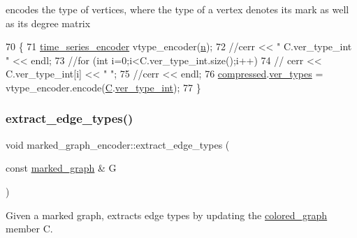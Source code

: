 encodes the type of vertices, where the type of a vertex denotes its mark as well as its degree matrix 


\begin{DoxyCode}
70 \{
71   \hyperlink{classtime__series__encoder}{time\_series\_encoder} vtype\_encoder(\hyperlink{classmarked__graph__encoder_a4c66d9fdbc14c97523715aac7e4511cb}{n});
72   \textcolor{comment}{//cerr << " C.ver\_type\_int " << endl;}
73   \textcolor{comment}{//for (int i=0;i<C.ver\_type\_int.size();i++)}
74   \textcolor{comment}{//  cerr << C.ver\_type\_int[i] << " ";}
75   \textcolor{comment}{//cerr << endl;}
76   \hyperlink{classmarked__graph__encoder_ac2ded200860fdd2321f86dd76b28bcb3}{compressed}.\hyperlink{classmarked__graph__compressed_af446cc5e23c241a92b76642fd5ebc403}{ver\_types} = vtype\_encoder.encode(\hyperlink{classmarked__graph__encoder_af82bc0653414091291cb75553a407bdb}{C}.\hyperlink{classcolored__graph_a491ed2ea1a65118af02ec606c8d44c0a}{ver\_type\_int});
77 \}
\end{DoxyCode}
\mbox{\label{classmarked__graph__encoder_ac3060e8f7e6abbe371c5968eb47cb8a1}} 
\subsubsection{\texorpdfstring{extract\+\_\+edge\+\_\+types()}{extract\_edge\_types()}}
{\footnotesize\ttfamily void marked\+\_\+graph\+\_\+encoder\+::extract\+\_\+edge\+\_\+types (\begin{DoxyParamCaption}\item[{const \hyperlink{classmarked__graph}{marked\+\_\+graph} \&}]{G }\end{DoxyParamCaption})\hspace{0.3cm}{\ttfamily [private]}}



Given a marked graph, extracts edge types by updating the \hyperlink{classcolored__graph}{colored\+\_\+graph} member C. 


